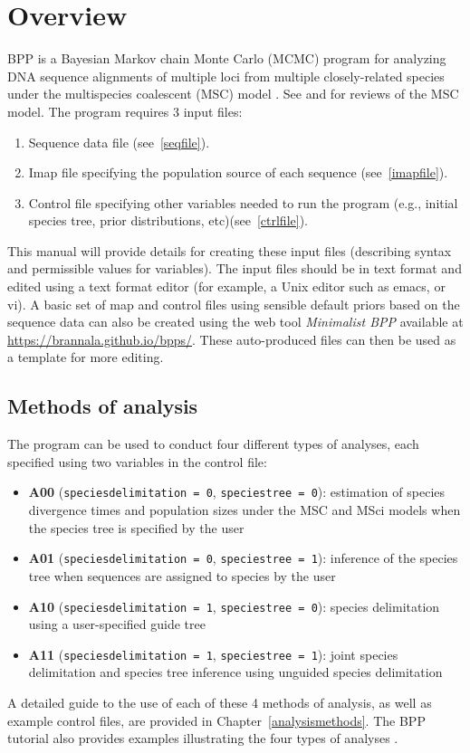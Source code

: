 \documentclass{book}
\numberwithin{equation}{section} \renewcommand{\baselinestretch}{0.55}
\begin{document}
\section{Overview}
\textsc{BPP} is a Bayesian Markov chain Monte Carlo (MCMC) program for
analyzing DNA sequence alignments of multiple loci from multiple
closely-related species under the multispecies coalescent (MSC) model
\citep{Yang2002, Rannala2003}.  See \cite{Xu2016} and
\cite{Rannala2020a} for reviews of the MSC model.  The program
requires 3 input files:
\begin{enumerate}
\item Sequence data file (see~\ref{seqfile}).
\item Imap file specifying the population source of each sequence
  (see~\ref{imapfile}).
\item Control file specifying other variables needed to run the
  program (e.g., initial species tree, prior distributions,
  etc)(see~\ref{ctrlfile}).
\end{enumerate}
This manual will provide details for creating these input files
(describing syntax and permissible values for variables). The input
files should be in text format and edited using a text format editor
(for example, a Unix editor such as emacs, or vi).  A basic set of map
and control files using sensible default priors based on the sequence
data can also be created using the web tool \emph{Minimalist BPP}
available at
\href{https://brannala.github.io/bpps/}{https://brannala.github.io/bpps/}.
These auto-produced files can then be used as a template for more
editing.

\subsection{Methods of analysis}
The program can be used to conduct four different types of analyses,
each specified using two variables in the control file:
\begin{itemize}
\item \textbf{A00} (\texttt{speciesdelimitation = 0},
  \texttt{speciestree = 0}): estimation of species divergence times
  and population sizes under the MSC and MSci models when the species
  tree is specified by the user \citep{Rannala2003, Flouri2020a}
\item \textbf{A01} (\texttt{speciesdelimitation = 0},
  \texttt{speciestree = 1}): inference of the species tree when
  sequences are assigned to species by the user \citep{Rannala2017}
\item \textbf{A10} (\texttt{speciesdelimitation = 1},
  \texttt{speciestree = 0}): species delimitation using a
  user-specified guide tree \citep{Yang2010, Rannala2013}
\item \textbf{A11} (\texttt{speciesdelimitation = 1},
  \texttt{speciestree = 1}): joint species delimitation and species
  tree inference using unguided species delimitation \citep{Yang2014a}
\end{itemize}
A detailed guide to the use of each of these 4 methods of analysis, as
well as example control files, are provided in
Chapter~\ref{analysismethods}.  The \textsc{BPP} tutorial also provides
examples illustrating the four types of analyses \citep{Yang2015,
  Flouri2020b}.
\end{document}
